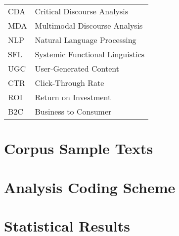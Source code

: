 \documentclass[12pt,a4paper,twoside,openright]{book}
\begin{document}
\begin{tabular}{ll}
CDA & Critical Discourse Analysis\\
MDA & Multimodal Discourse Analysis\\
NLP & Natural Language Processing\\
SFL & Systemic Functional Linguistics\\
UGC & User-Generated Content\\
CTR & Click-Through Rate\\
ROI & Return on Investment\\
B2C & Business to Consumer\\
\end{tabular}

\mainmatter









\backmatter

\printbibliography[heading=bibintoc,title={References}]

\appendix
\chapter{Corpus Sample Texts}
\chapter{Analysis Coding Scheme}
\chapter{Statistical Results}
\end{document}
